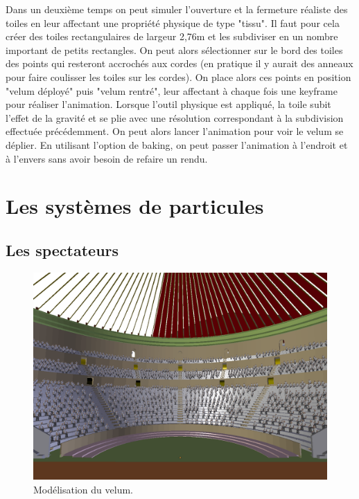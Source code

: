 Dans un deuxième temps on peut simuler l'ouverture et la fermeture réaliste des toiles en leur affectant une propriété physique de type "tissu". Il faut pour cela créer des toiles rectangulaires de largeur 2,76m et les subdiviser en un nombre important de petits rectangles. On peut alors sélectionner sur le bord des toiles des points qui resteront accrochés aux cordes (en pratique il y aurait des anneaux pour faire coulisser les toiles sur les cordes). On place alors ces points en position "velum déployé" puis "velum rentré", leur affectant à chaque fois une \gls{keyframe} pour réaliser l'animation. Lorsque l'outil physique est appliqué, la toile subit l'effet de la gravité et se plie avec une résolution correspondant à la subdivision effectuée précédemment. On peut alors lancer l'animation pour voir le \gls{velum} se déplier. En utilisant l'option de \gls{baking}, on peut passer l'animation à l'endroit et à l'envers sans avoir besoin de refaire un rendu.



\section{Les systèmes de \glspl{particule}}
\subsection{Les spectateurs}

\begin{figure}[!h]
	\centering
	\includegraphics[width=\textwidth]{images/modPublic}
	\caption{Modélisation du \gls{velum}.} 
	\label{modPublic} 
\end{figure}

